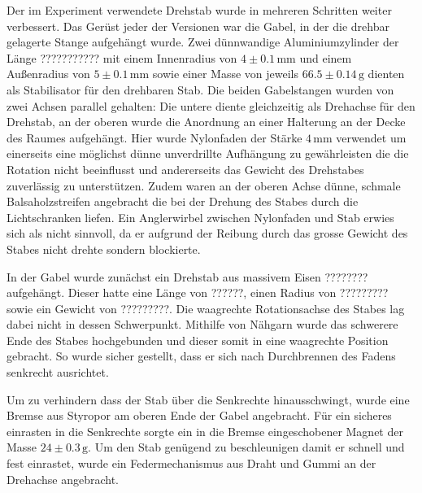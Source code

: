 \documentclass[11pt]{scrartcl}
\newcommand{\unit}[1]{\ensuremath{\,\mathrm{#1}}} %
\begin{document}
Der im Experiment verwendete Drehstab wurde in mehreren Schritten weiter verbessert. Das Ger\"ust jeder der Versionen war die Gabel, in der die drehbar gelagerte Stange aufgeh\"angt wurde. Zwei d\"unnwandige Aluminiumzylinder der L\"ange ??????????? mit einem Innenradius von $4\pm 0.1\unit{mm}$ und einem Au\ss{}enradius von $5\pm 0.1\unit{mm}$ sowie einer Masse von jeweils $66.5\pm 0.14\unit{g}$ dienten als Stabilisator f\"ur den drehbaren Stab. Die beiden Gabelstangen wurden von zwei Achsen parallel gehalten: Die untere diente gleichzeitig als Drehachse f\"ur den Drehstab, an der oberen wurde die Anordnung an einer Halterung an der Decke des Raumes aufgeh\"angt. Hier wurde Nylonfaden der St\"arke $4\unit{mm}$
 verwendet um einerseits eine m\"oglichst d\"unne unverdrillte Aufh\"angung zu gew\"ahrleisten die die Rotation nicht beeinflusst und andererseits das Gewicht des Drehstabes zuverl\"assig zu unterst\"utzen. Zudem waren an der oberen Achse d\"unne, schmale Balsaholzstreifen angebracht die bei der Drehung des Stabes durch die Lichtschranken liefen. Ein Anglerwirbel zwischen Nylonfaden und Stab erwies sich als nicht sinnvoll, da er aufgrund der Reibung durch das grosse Gewicht des Stabes nicht drehte sondern blockierte.

In der Gabel wurde zun\"achst ein Drehstab aus massivem Eisen ???????? aufgeh\"angt. Dieser hatte eine L\"ange von ??????, einen Radius von ????????? sowie ein Gewicht von ?????????. Die waagrechte Rotationsachse des Stabes lag dabei nicht in dessen Schwerpunkt. Mithilfe von N\"ahgarn wurde das schwerere Ende des Stabes hochgebunden und dieser somit in eine waagrechte Position gebracht. So wurde sicher gestellt, dass er sich nach Durchbrennen des Fadens senkrecht ausrichtet.

Um zu verhindern dass der Stab \"uber die Senkrechte hinausschwingt, wurde eine Bremse aus Styropor am oberen Ende der Gabel angebracht. F\"ur ein sicheres einrasten in die Senkrechte sorgte ein in die Bremse eingeschobener Magnet der Masse $24 \pm 0.3\unit{g}$. Um den Stab gen\"ugend zu beschleunigen damit er schnell und fest einrastet, wurde ein Federmechanismus aus Draht und Gummi an der Drehachse angebracht. %
%
\end{document}
